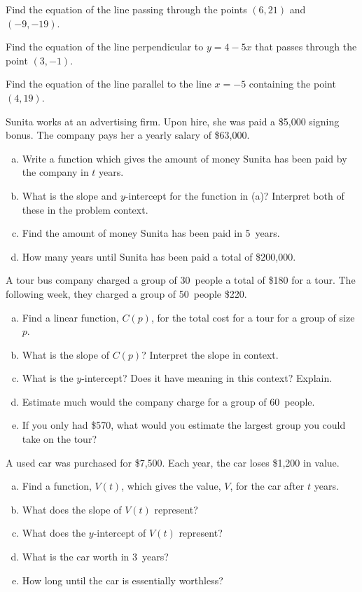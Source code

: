\documentclass[11pt,letterpaper]{article}
\begin{document}
\prob Find the equation of the line passing through the points $(6, 21)$ and $(-9, -19)$. \pspace


\prob Find the equation of the line perpendicular to $y= 4 - 5x$ that passes through the point $(3, -1)$. \pspace


\prob Find the equation of the line parallel to the line $x= -5$ containing the point $(4, 19)$. \pspace


\prob Sunita works at an advertising firm. Upon hire, she was paid a \$5,000 signing bonus. The company pays her a yearly salary of \$63,000. 
        \begin{enumerate}[(a)]
        \item Write a function which gives the amount of money Sunita has been paid by the company in $t$ years. 
        \item What is the slope and $y$-intercept for the function in (a)? Interpret both of these in the problem context. 
        \item Find the amount of money Sunita has been paid in 5~years.
        \item How many years until Sunita has been paid a total of \$200,000. 
        \end{enumerate} \pspace


\prob A tour bus company charged a group of 30~people a total of \$180 for a tour. The following week, they charged a group of 50~people \$220.
        \begin{enumerate}[(a)]
        \item Find a linear function, $C(p)$, for the total cost for a tour for a group of size $p$. 
        \item What is the slope of $C(p)$? Interpret the slope in context. 
        \item What is the $y$-intercept? Does it have meaning in this context? Explain. 
        \item Estimate much would the company charge for a group of 60~people.
        \item If you only had \$570, what would you estimate the largest group you could take on the tour?
        \end{enumerate} \pspace


\prob A used car was purchased for \$7,500. Each year, the car loses \$1,200 in value.
        \begin{enumerate}[(a)]
        \item Find a function, $V(t)$, which gives the value, $V$, for the car after $t$ years.
        \item What does the slope of $V(t)$ represent?
        \item What does the $y$-intercept of $V(t)$ represent?
        \item What is the car worth in 3~years?
        \item How long until the car is essentially worthless? 
        \end{enumerate} \pspace
\end{document}
